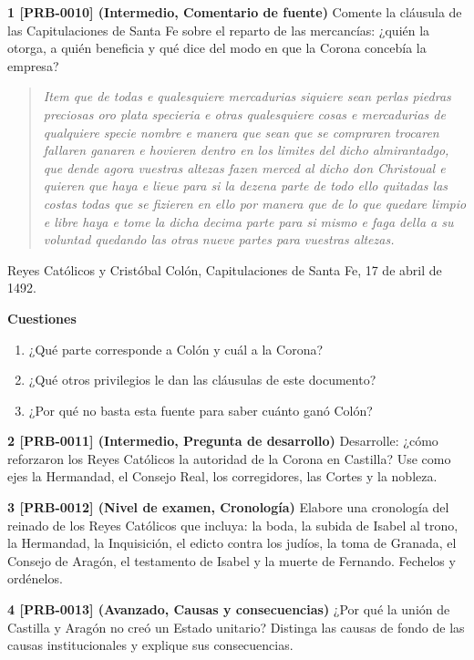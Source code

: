 \documentclass{book}
\begin{document}
\begin{tcolorbox}[title={Ejercicios}, studiumworked, breakable]

\noindent\textbf{1 [PRB-0010] (Intermedio, Comentario de fuente)}
Comente la cláusula de las Capitulaciones de Santa Fe sobre el reparto de las mercancías: ¿quién la otorga, a quién beneficia y qué dice del modo en que la Corona concebía la empresa?


\begin{quote}
\itshape Item que de todas e qualesquiere mercadurias siquiere sean perlas piedras preciosas oro plata specieria e otras qualesquiere cosas e mercadurias de qualquiere specie nombre e manera que sean que se compraren trocaren fallaren ganaren e hovieren dentro en los limites del dicho almirantadgo, que dende agora vuestras altezas fazen merced al dicho don Christoual e quieren que haya e lieue para si la dezena parte de todo ello quitadas las costas todas que se fizieren en ello por manera que de lo que quedare limpio e libre haya e tome la dicha decima parte para si mismo e faga della a su voluntad quedando las otras nueve partes para vuestras altezas.
\end{quote}
{\noindent\footnotesize Reyes Católicos y Cristóbal Colón, Capitulaciones de Santa Fe, 17 de abril de 1492.\par}

\noindent\textbf{Cuestiones}
\begin{enumerate}
\item ¿Qué parte corresponde a Colón y cuál a la Corona?
\item ¿Qué otros privilegios le dan las cláusulas de este documento?
\item ¿Por qué no basta esta fuente para saber cuánto ganó Colón?
\end{enumerate}

\noindent\textbf{2 [PRB-0011] (Intermedio, Pregunta de desarrollo)}
Desarrolle: ¿cómo reforzaron los Reyes Católicos la autoridad de la Corona en Castilla? Use como ejes la Hermandad, el Consejo Real, los corregidores, las Cortes y la nobleza.


\noindent\textbf{3 [PRB-0012] (Nivel de examen, Cronología)}
Elabore una cronología del reinado de los Reyes Católicos que incluya: la boda, la subida de Isabel al trono, la Hermandad, la Inquisición, el edicto contra los judíos, la toma de Granada, el Consejo de Aragón, el testamento de Isabel y la muerte de Fernando. Fechelos y ordénelos.


\noindent\textbf{4 [PRB-0013] (Avanzado, Causas y consecuencias)}
¿Por qué la unión de Castilla y Aragón no creó un Estado unitario? Distinga las causas de fondo de las causas institucionales y explique sus consecuencias.

\end{tcolorbox}
\end{document}
